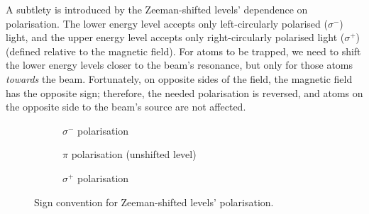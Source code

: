 \documentclass[11pt,twoside,a4paper]{article}
\begin{document}
A subtlety is introduced by the Zeeman-shifted levels' dependence on polarisation. The lower energy level accepts only left-circularly polarised (\(\sigma^-\)) light, and the upper energy level accepts only right-circularly polarised light (\(\sigma^+\)) (defined relative to the magnetic field). For atoms to be trapped, we need to shift the lower energy
levels closer to the beam's resonance, but only for those atoms \textit{towards} the beam. Fortunately, on opposite sides of the field, the magnetic field has the opposite sign; therefore, the needed polarisation is reversed, and atoms on the opposite side to the beam's source are not affected.~\cite{umkc}
\begin{figure}[h]
    \centering
    \begin{subfigure}{.3\textwidth}
        \centering
        \caption{\(\sigma^-\) polarisation}
    \end{subfigure}
    \begin{subfigure}{.3\textwidth}
        \centering
        \caption{\(\pi\) polarisation (unshifted level)}
    \end{subfigure}
    \begin{subfigure}{.3\textwidth}
        \centering
        \caption{\(\sigma^+\) polarisation}
    \end{subfigure}

    \caption{Sign convention for Zeeman-shifted levels' polarisation.}
\end{figure}
\vfill
\pagebreak
\end{document}
